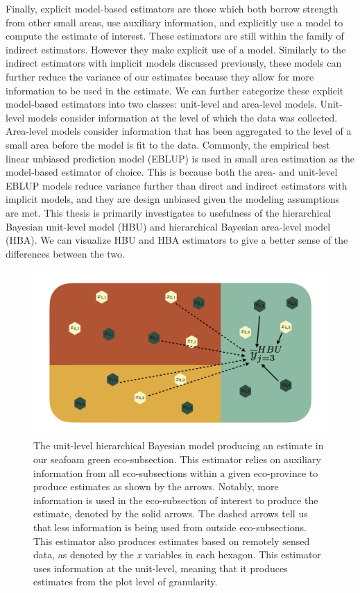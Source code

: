 \documentclass[12pt,twoside]{reedthesis}
\begin{document}
Finally, explicit model-based estimators are those which both borrow strength from other small areas, use auxiliary information, and explicitly use a model to compute the estimate of interest. These estimators are still within the family of indirect estimators. However they make explicit use of a model. Similarly to the indirect estimators with implicit models discussed previously, these models can further reduce the variance of our estimates because they allow for more information to be used in the estimate. We can further categorize these explicit model-based estimators into two classes: unit-level and area-level models. Unit-level models consider information at the level of which the data was collected. Area-level models consider information that has been aggregated to the level of a small area before the model is fit to the data. Commonly, the empirical best linear unbiased prediction model (EBLUP) is used in small area estimation as the model-based estimator of choice. This is because both the area- and unit-level EBLUP models reduce variance further than direct and indirect estimators with implicit models, and they are design unbiased given the modeling assumptions are met. This thesis is primarily investigates to usefulness of the hierarchical Bayesian unit-level model (HBU) and hierarchical Bayesian area-level model (HBA). We can visualize HBU and HBA estimators to give a better sense of the differences between the two.
\begin{figure}

{\centering \includegraphics[width=1\linewidth]{figure/hbu-diagram} 

}

\caption[The unit-level hierarchical Bayesian model]{The unit-level hierarchical Bayesian model producing an estimate in our seafoam green eco-subsection. This estimator relies on auxiliary information from all eco-subsections within a given eco-province to produce estimates as shown by the arrows. Notably, more information is used in the eco-subsection of interest to produce the estimate, denoted by the solid arrows. The dashed arrows tell us that less information is being used from outside eco-subsections. This estimator also produces estimates based on remotely sensed data, as denoted by the \textit{x} variables in each hexagon. This estimator uses information at the unit-level, meaning that it produces estimates from the plot level of granularity.}\label{fig:hbu-diagram}
\end{figure}
\end{document}
